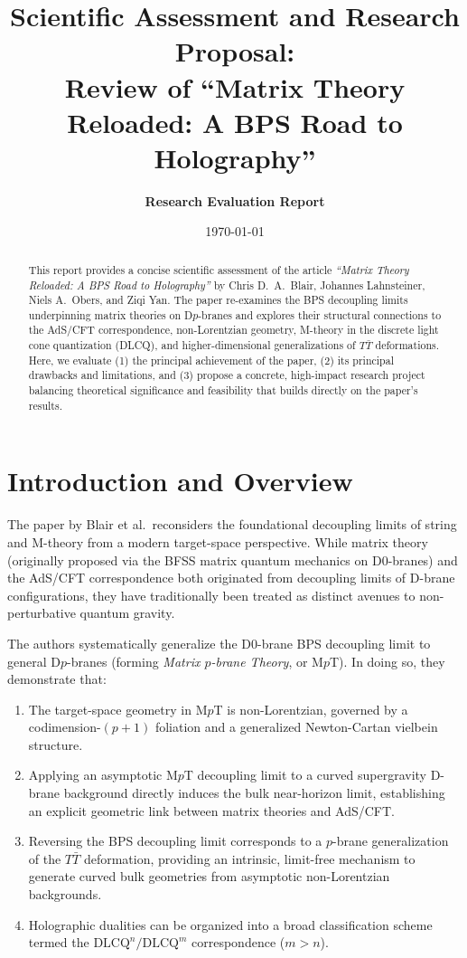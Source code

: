 \documentclass[11pt,a4paper]{article}
\title{\textbf{Scientific Assessment and Research Proposal:}\\[0.5em]
\Large Review of ``Matrix Theory Reloaded: A BPS Road to Holography''}
\author{\textbf{Research Evaluation Report}}
\date{\today}
\begin{document}
\maketitle

\begin{abstract}
This report provides a concise scientific assessment of the article \emph{``Matrix Theory Reloaded: A BPS Road to Holography''} by Chris D.~A.~Blair, Johannes Lahnsteiner, Niels A.~Obers, and Ziqi Yan. The paper re-examines the BPS decoupling limits underpinning matrix theories on D$p$-branes and explores their structural connections to the AdS/CFT correspondence, non-Lorentzian geometry, M-theory in the discrete light cone quantization (DLCQ), and higher-dimensional generalizations of $T\bar{T}$ deformations. Here, we evaluate (1) the principal achievement of the paper, (2) its principal drawbacks and limitations, and (3) propose a concrete, high-impact research project balancing theoretical significance and feasibility that builds directly on the paper's results.
\end{abstract}

\vspace{1em}

\section{Introduction and Overview}
The paper by Blair et al.\ reconsiders the foundational decoupling limits of string and M-theory from a modern target-space perspective. While matrix theory (originally proposed via the BFSS matrix quantum mechanics on D0-branes) and the AdS/CFT correspondence both originated from decoupling limits of D-brane configurations, they have traditionally been treated as distinct avenues to non-perturbative quantum gravity. 

The authors systematically generalize the D0-brane BPS decoupling limit to general D$p$-branes (forming \emph{Matrix $p$-brane Theory}, or M$p$T). In doing so, they demonstrate that:
\begin{enumerate}
    \item The target-space geometry in M$p$T is non-Lorentzian, governed by a codimension-$(p+1)$ foliation and a generalized Newton-Cartan vielbein structure.
    \item Applying an asymptotic M$p$T decoupling limit to a curved supergravity D-brane background directly induces the bulk near-horizon limit, establishing an explicit geometric link between matrix theories and AdS/CFT.
    \item Reversing the BPS decoupling limit corresponds to a $p$-brane generalization of the $T\bar{T}$ deformation, providing an intrinsic, limit-free mechanism to generate curved bulk geometries from asymptotic non-Lorentzian backgrounds.
    \item Holographic dualities can be organized into a broad classification scheme termed the $\text{DLCQ}^n/\text{DLCQ}^m$ correspondence ($m > n$).
\end{enumerate}
\end{document}
